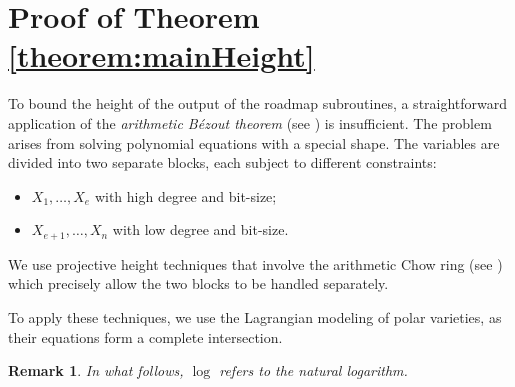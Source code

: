 \documentclass[12pt]{article}
\newtheorem{remark}[theorem]{Remark}
\begin{document}
\section{Proof of Theorem \ref{theorem:mainHeight}}
To bound the height of the output of the roadmap subroutines, a straightforward application of the \textit{arithmetic B\'ezout theorem} (see \cite{SharpEstimatesForTheEffectiveN}) is insufficient. The problem arises from solving polynomial equations with a special shape. The variables are divided into two separate blocks, each subject to different constraints:
\begin{itemize}
    \item $X_1,\hdots,X_e$ with high degree and bit-size;
    \item $X_{e+1},\hdots,X_n$ with low degree and bit-size. 
\end{itemize}
We use projective height techniques that involve the arithmetic Chow ring (see \cite{EN}) which precisely allow the two blocks to be handled separately.

To apply these techniques, we use the Lagrangian modeling of polar varieties, as their equations form a complete intersection. 







\begin{remark}
    In what follows, $\log$ refers to the natural logarithm. 
\end{remark}


\end{document}
